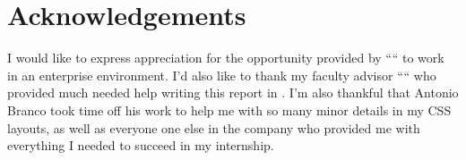 


% 
% 
% 

\begingroup
\let\clearpage\relax
\let\cleardoublepage\relax
\let\cleardoublepage\relax
\chapter*{Acknowledgements}

I would like to express appreciation for the opportunity provided by ``\company`` to work
in an enterprise environment. I'd also like to thank my faculty advisor ``\myProf`` 
who provided much needed help writing this report in \LaTeXe. I'm also thankful that 
Antonio Branco took time off his work to help me with so many minor details in my CSS
layouts, as well as everyone one else in the company who provided me with everything I
needed to succeed in my internship.\\



\endgroup



